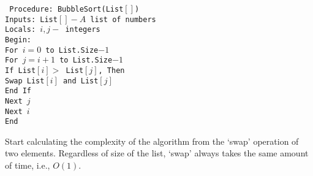 \documentclass[9pt]{beamer}
\begin{document}
\begin{frame}
\texttt{
\hspace*{1.5cm} Procedure: BubbleSort(List$[ ]$)\\
\hspace*{2cm} Inputs: List$[ ] - A$ list of numbers \\
\hspace*{2cm} Locals: $i, j -$ integers \\
\hspace*{2cm} Begin:\\
\hspace*{2.5cm} For $i = 0$ to List.Size$-1$ \\
\hspace*{3cm} For $j = i + 1$ to List.Size$-1$ \\
\hspace*{3.5cm} If List$[i] >$ List$[j]$, Then \\
\hspace*{4cm} Swap List$[i]$ and List$[j]$ \\
\hspace*{3.5cm} End If \\
\hspace*{3cm} Next $j$ \\
\hspace*{2.5cm} Next $i$ \\
\hspace*{2cm} End \\
}

\hspace*{0.5cm} Start calculating the complexity of the algorithm from the ‘swap’ operation of two elements.
Regardless of size of the list, ‘swap’ always takes the same amount of time, i.e., $O(1)$.
\end{frame}
\end{document}
